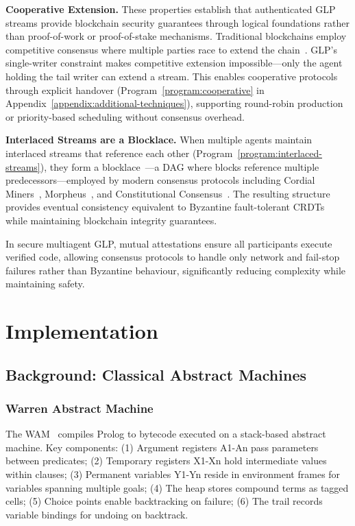 \documentclass[runningheads,thm-restate]{llncs}
\newcommand{\mypara}[1]{\smallskip\noindent\textbf{#1.}}
\begin{document}
\mypara{Cooperative Extension} These properties establish that authenticated GLP streams provide blockchain security guarantees through logical foundations rather than proof-of-work or proof-of-stake mechanisms.
Traditional blockchains employ competitive consensus where multiple parties race to extend the chain~\cite{garay2015bitcoin}. GLP's single-writer constraint makes competitive extension impossible---only the agent holding the tail writer can extend a stream. This enables cooperative protocols through explicit handover (Program~\ref{program:cooperative} in Appendix~\ref{appendix:additional-techniques}), supporting round-robin production or priority-based scheduling without consensus overhead.

\mypara{Interlaced Streams are a Blocklace}
When multiple agents maintain interlaced streams that reference each other (Program~\ref{program:interlaced-streams}), they form a blocklace~\cite{almeida2024blocklace}---a DAG where blocks reference multiple predecessors---employed by modern consensus protocols including Cordial Miners~\cite{keidar2023cordial},  Morpheus~\cite{lewis2025morpheus}, and Constitutional Consensus~\cite{keidar2025constitutional}.
The resulting structure provides eventual consistency equivalent to Byzantine fault-tolerant CRDTs~\cite{shapiro2011conflict} while maintaining blockchain integrity guarantees.

In secure multiagent GLP, mutual attestations ensure all participants execute verified code, allowing consensus protocols to handle only network and fail-stop failures rather than Byzantine behaviour, significantly reducing complexity while maintaining safety.



\section{Implementation}\label{section:implementation}

\subsection{Background: Classical Abstract Machines}

\subsubsection{Warren Abstract Machine}

The WAM~\cite{warren1983abstract} compiles Prolog to bytecode executed on a stack-based abstract machine. Key components: (1) Argument registers A1-An pass parameters between predicates; (2) Temporary registers X1-Xn hold intermediate values within clauses; (3) Permanent variables Y1-Yn reside in environment frames for variables spanning multiple goals; (4) The heap stores compound terms as tagged cells; (5) Choice points enable backtracking on failure; (6) The trail records variable bindings for undoing on backtrack.
\end{document}

